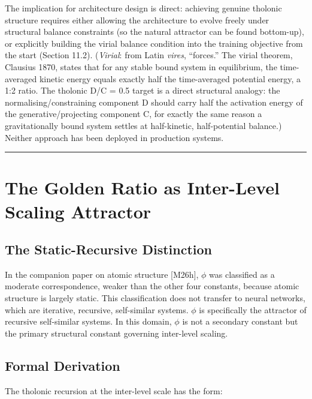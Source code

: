 \documentclass[12pt]{article}
\begin{document}
The implication for architecture design is direct: achieving genuine
tholonic structure requires either allowing the architecture to evolve
freely under structural balance constraints (so the natural attractor
can be found bottom-up), or explicitly building the virial balance
condition into the training objective from the start (Section 11.2).
(\emph{Virial}: from Latin \emph{vires}, ``forces.'' The virial theorem,
Clausius 1870, states that for any stable bound system in equilibrium,
the time-averaged kinetic energy equals exactly half the time-averaged
potential energy, a 1:2 ratio. The tholonic D/C = 0.5 target is a direct
structural analogy: the normalising/constraining component D should
carry half the activation energy of the generative/projecting component
C, for exactly the same reason a gravitationally bound system settles at
half-kinetic, half-potential balance.) Neither approach has been
deployed in production systems.

\begin{center}\rule{0.5\linewidth}{0.5pt}\end{center}

\section{The Golden Ratio as Inter-Level Scaling Attractor}\label{the-golden-ratio-as-inter-level-scaling-attractor}

\subsection{The Static-Recursive Distinction}\label{the-static-recursive-distinction}

In the companion paper on atomic structure {[}M26h{]}, \(\phi\) was
classified as a moderate correspondence, weaker than the other four
constants, because atomic structure is largely static. This
classification does not transfer to neural networks, which are
iterative, recursive, self-similar systems. \(\phi\) is specifically the
attractor of recursive self-similar systems. In this domain, \(\phi\) is
not a secondary constant but the primary structural constant governing
inter-level scaling.

\subsection{Formal Derivation}\label{formal-derivation}

The tholonic recursion at the inter-level scale has the form:
\end{document}
